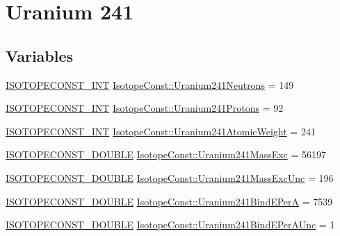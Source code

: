 \hypertarget{group___isotope_const-_uranium-_u241}{}\section{Uranium 241}
\label{group___isotope_const-_uranium-_u241}
\subsection*{Variables}
\begin{DoxyCompactItemize}
\item 
\mbox{\hyperlink{group___isotope_const-_macros_ga5f18360b3e99483a35c32d789e62621c}{I\+S\+O\+T\+O\+P\+E\+C\+O\+N\+S\+T\+\_\+\+I\+NT}} \mbox{\hyperlink{group___isotope_const-_uranium-_u241_gab97e1dda2432aaa2f4f847b8ffbc8e37}{Isotope\+Const\+::\+Uranium241\+Neutrons}} = 149
\item 
\mbox{\hyperlink{group___isotope_const-_macros_ga5f18360b3e99483a35c32d789e62621c}{I\+S\+O\+T\+O\+P\+E\+C\+O\+N\+S\+T\+\_\+\+I\+NT}} \mbox{\hyperlink{group___isotope_const-_uranium-_u241_gae603880b32da8b90e0321739f7c504c9}{Isotope\+Const\+::\+Uranium241\+Protons}} = 92
\item 
\mbox{\hyperlink{group___isotope_const-_macros_ga5f18360b3e99483a35c32d789e62621c}{I\+S\+O\+T\+O\+P\+E\+C\+O\+N\+S\+T\+\_\+\+I\+NT}} \mbox{\hyperlink{group___isotope_const-_uranium-_u241_ga82d12bac2543f3209517408fa168aae2}{Isotope\+Const\+::\+Uranium241\+Atomic\+Weight}} = 241
\item 
\mbox{\hyperlink{group___isotope_const-_macros_ga8f45a7272ce02c0b4c65c44636ed719a}{I\+S\+O\+T\+O\+P\+E\+C\+O\+N\+S\+T\+\_\+\+D\+O\+U\+B\+LE}} \mbox{\hyperlink{group___isotope_const-_uranium-_u241_gade5c471f45b08a17d8bc74c1466ad411}{Isotope\+Const\+::\+Uranium241\+Mass\+Exc}} = 56197
\item 
\mbox{\hyperlink{group___isotope_const-_macros_ga8f45a7272ce02c0b4c65c44636ed719a}{I\+S\+O\+T\+O\+P\+E\+C\+O\+N\+S\+T\+\_\+\+D\+O\+U\+B\+LE}} \mbox{\hyperlink{group___isotope_const-_uranium-_u241_ga6c3da902c5a62a4f27f91d18fdf1d2ce}{Isotope\+Const\+::\+Uranium241\+Mass\+Exc\+Unc}} = 196
\item 
\mbox{\hyperlink{group___isotope_const-_macros_ga8f45a7272ce02c0b4c65c44636ed719a}{I\+S\+O\+T\+O\+P\+E\+C\+O\+N\+S\+T\+\_\+\+D\+O\+U\+B\+LE}} \mbox{\hyperlink{group___isotope_const-_uranium-_u241_ga59e3fbf64296666f3c4f734e41e9621b}{Isotope\+Const\+::\+Uranium241\+Bind\+E\+PerA}} = 7539
\item 
\mbox{\hyperlink{group___isotope_const-_macros_ga8f45a7272ce02c0b4c65c44636ed719a}{I\+S\+O\+T\+O\+P\+E\+C\+O\+N\+S\+T\+\_\+\+D\+O\+U\+B\+LE}} \mbox{\hyperlink{group___isotope_const-_uranium-_u241_ga073a2a0693885b84e42ed92bd77c6925}{Isotope\+Const\+::\+Uranium241\+Bind\+E\+Per\+A\+Unc}} = 1

\end{DoxyCompactItemize}
